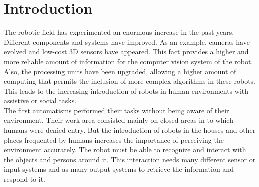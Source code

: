 \chapter{Introduction}
The robotic field has experimented an enormous increase in the past years. 
Different components and systems have improved.
As an example, cameras have evolved and low-cost 3D sensors have appeared. 
This fact provides a higher and more reliable amount of information for the computer vision system of the robot.  
Also, the processing units have been upgraded, allowing a higher amount of computing that permits the inclusion of more complex algorithms in these robots.  
This leads to the increasing introduction of robots in human environments with assistive or social tasks. 
\\


The first automatisms performed their tasks without being aware of their environment. 
Their work area consisted mainly on closed areas in to which humans were denied entry. 
But the introduction of robots in the houses and other places frequented by humans increases the importance of perceiving the environment accurately. 
The robot must be able to recognize and interact with the objects and persons around it. 
This interaction needs many different sensor or input systems and as many output systems to retrieve the information and respond to it.  
\\


